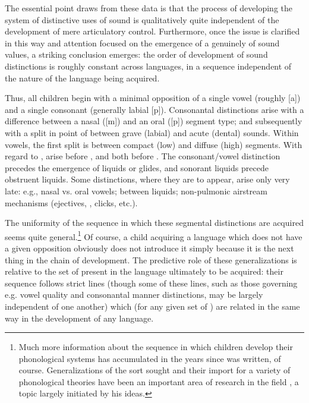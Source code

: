 The essential point {\Jakobson} draws from these data is that the process
of developing the system of distinctive uses of sound is qualitatively
quite independent of the development of mere articulatory
control. Furthermore, once the issue is clarified in this way and
attention focused on the emergence of a genuinely  of
sound values, a striking conclusion emerges: the order of development
of sound distinctions is roughly constant across languages, in a
sequence independent of the nature of the language being acquired.

Thus, all children begin with a minimal opposition of a single vowel
(roughly [a]) and a single consonant (generally labial
[p]). Consonantal distinctions arise with a difference between a nasal
([m]) and an oral ([p]) segment type; and subsequently with a split in
point of  between grave (labial) and acute (dental)
sounds. Within vowels, the first split is between compact (low) and
diffuse (high) segments. With regard to , 
arise before , and both before . The
consonant/vowel distinction precedes the emergence of liquids or
glides, and sonorant liquids precede obstruent liquids. Some
distinctions, where they are to appear, arise only very late: e.g.,
nasal vs. oral vowels;  between liquids; non-pulmonic
airstream mechanisms (ejectives, , clicks,
etc.).

The uniformity of the sequence in which these segmental distinctions
are acquired seems quite general.\footnote{Much more information about
  the sequence in which children develop their phonological systems
  has accumulated in the years since \citealt{jakobson:kindersprache}
  was written, of course.  Generalizations of the sort {\Jakobson} sought
  and their import for a variety of phonological theories have been an
  important area of research in the field
  \citep{rose.inkelas11:child.language}, a topic largely initiated by
  his ideas.} Of course, a child acquiring a language which does not
have a given opposition obviously does not introduce it simply because
it is the next thing in the chain of development. The predictive role
of these generalizations is relative to the set of  present
in the language ultimately to be acquired: their sequence follows
strict lines (though some of these lines, such as those governing
e.g. vowel quality and consonantal manner distinctions, may be largely
independent of one another) which (for any given set of )
are related in the same way in the development of any language.

